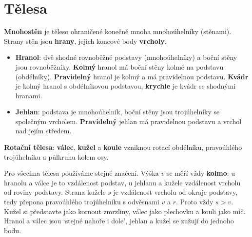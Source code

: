\section{Tělesa}\label{sec:telesa}

\begin{definitionbox}
  \textbf{Mnohostěn} je těleso ohraničené konečně mnoha mnohoúhelníky (stěnami). Strany stěn jsou \textbf{hrany}, jejich koncové body \textbf{vrcholy}.
  \begin{itemize}
    \item \textbf{Hranol}: dvě shodné rovnoběžné podstavy (mnohoúhelníky) a boční stěny jsou rovnoběžníky. \textbf{Kolmý} hranol má boční stěny kolmé na podstavu (obdélníky). \textbf{Pravidelný} hranol je kolmý a má pravidelnou podstavu. \textbf{Kvádr} je kolmý hranol s obdélníkovou podstavou, \textbf{krychle} je kvádr se shodnými hranami.
    \item \textbf{Jehlan}: podstava je mnohoúhelník, boční stěny jsou trojúhelníky se společným vrcholem. \textbf{Pravidelný} jehlan má pravidelnou podstavu a vrchol nad jejím středem.
  \end{itemize}
  \textbf{Rotační tělesa}: \textbf{válec}, \textbf{kužel} a \textbf{koule} vzniknou rotací obdélníku, pravoúhlého trojúhelníku a půlkruhu kolem osy.
\end{definitionbox}

Pro všechna tělesa používáme stejné značení. Výška $v$ se měří vždy \textbf{kolmo}: u hranolu a válce je to vzdálenost podstav, u jehlanu a kužele vzdálenost vrcholu od roviny podstavy. Strana kužele $s$ je vzdálenost vrcholu od okraje podstavy, tedy přepona pravoúhlého trojúhelníku s odvěsnami $v$ a $r$. Proto vždy $s > v$. Kužel si představte jako kornout zmrzliny, válec jako plechovku a kouli jako míč. Hranol a válec jsou `stejné nahoře i dole', jehlan a kužel se zužují do jednoho bodu.

